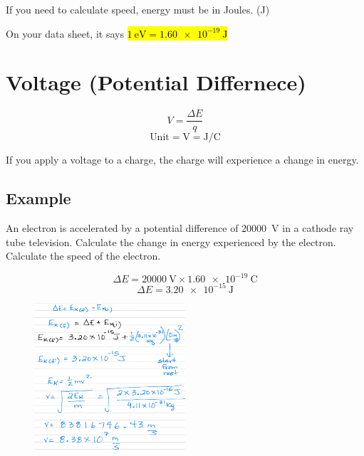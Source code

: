 \documentclass[a4paper,12pt]{article}
\begin{document}
If you need to calculate speed, energy must be in Joules. (\si{\joule})

On your data sheet, it says \hl{$\SI{1}{\electronvolt} = \SI{1.60e-19}{\joule}$}

\section{Voltage (Potential Differnece)}
$$V = \frac{\Delta{E}}{q}$$
$$\textrm{Unit} = \si{\volt} = \si{\joule\per\coulomb}$$

If you apply a voltage to a charge, the charge will experience a change in energy.

\subsection{Example}
An electron is accelerated by a potential difference of \SI{20000}{\volt} in a cathode ray tube television. Calculate the change in energy experienced by the electron. Calculate the speed of the electron.

$$\Delta{E} = \SI{20000}{\volt} \times \SI{1.60e-19}{\coulomb}$$
$$\Delta{E} = \SI{3.20e-15}{\joule}$$

\begin{figure}[H]
    \centering
    \includegraphics[width=0.5\textwidth]{voltage}
\end{figure}
\end{document}
